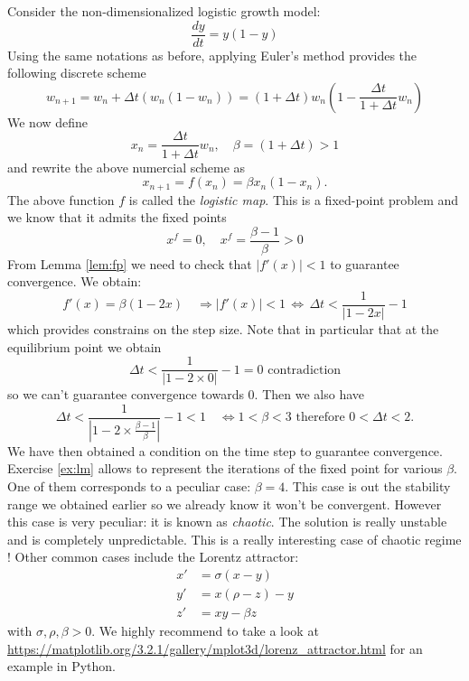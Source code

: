 Consider the non-dimensionalized logistic growth model:
\[ \displaystyle \frac{d y}{d t} = y (1- y)\]
Using the same notations as before, applying Euler's method provides the following discrete scheme
\[ \displaystyle w_{n+1}=w_n + \Delta t ( w_n (1- w_n) ) = (1 + \Delta t) w_n (1 - \frac{\Delta t }{1 + \Delta t} w_n)\]
We now define
\[x_n =  \frac{\Delta t }{1 + \Delta t} w_n, \quad \beta = (1 + \Delta t)  >1\]
 and rewrite the above numercial scheme as 
 \[x_{n+1} = f(x_n )= \beta x_n (1- x_n).\]
 The above function $f$ is called the \textit{logistic map}. This is a fixed-point problem and we know that it admits the fixed points
 \[x^f = 0, \quad x^f = \frac{\beta -1 }{\beta} >0\]
 From Lemma \ref{lem:fp} we need to check that $|f'(x)| < 1$ to guarantee convergence. We obtain:
 \[f'(x) = \beta (1 - 2 x) \quad \Longrightarrow |f'(x)| < 1 \, \Longleftrightarrow \, \Delta t < \frac{1}{|1- 2x|} -1 \]
 which provides constrains on the step size.
 Note that in particular that at the equilibrium point we obtain
 \[\Delta t < \frac{1}{|1- 2 \times 0|} -1 = 0 \mbox{ contradiction} \]
 so we can't guarantee convergence towards $0$. Then we also have
  \[\Delta t < \frac{1}{|1- 2 \times \frac{\beta -1}{\beta}|} -1 <1 \quad \Longleftrightarrow 1 < \beta < 3 \mbox{ therefore } 0 <  \Delta t < 2.\]
  We have then obtained a condition on the time step to guarantee convergence.  Exercise \ref{ex:lm} allows to represent the iterations of the fixed point for various $\beta$. One of them corresponds to a peculiar case: $\beta = 4$. This case is out the stability range we obtained earlier so we already know it won't be convergent. However this case is very peculiar: it is known as \textit{chaotic}. The solution is really unstable and is completely unpredictable. This is a really interesting case of chaotic regime ! Other common cases include the Lorentz attractor:
  \[\begin{aligned}
  x' & = \sigma (x-y)\\
  y' & = x(\rho -z) - y \\
  z'  &= xy - \beta z
  \end{aligned}
  \]
  with $\sigma, \rho, \beta >0$. 
  We highly recommend to take a look at \url{https://matplotlib.org/3.2.1/gallery/mplot3d/lorenz_attractor.html} for an example in Python.
